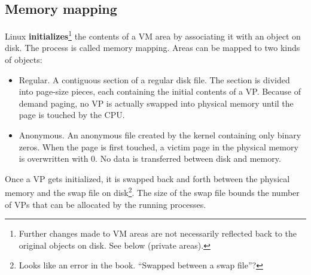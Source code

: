 \subsection{Memory mapping}	
Linux \textbf{initializes}\footnote{Further changes made to VM areas are not necessarily reflected back to the original objects on disk. See below (private areas).} the contents of a VM area by associating it with an object on disk. The process is called memory mapping. Areas can be mapped to two kinds of objects: 
\begin{itemize}
	\item Regular. A contiguous section of a regular disk file. The section is divided into page-size pieces, each containing the initial contents of a VP. Because of demand paging, no VP is actually swapped into physical memory until the page is touched by the CPU.
	\item Anonymous. An anonymous file created by the kernel containing only binary zeros. When the page is first touched, a victim page in the physical memory is overwritten with 0. No data is transferred between disk and memory.  
\end{itemize}
Once a VP gets initialized, it is swapped back and forth between the physical memory and the swap file on disk\footnote{Looks like an error in the book. ``Swapped between a swap file''?}. The size of the swap file bounds the number of VPs that can be allocated by the running processes. 

